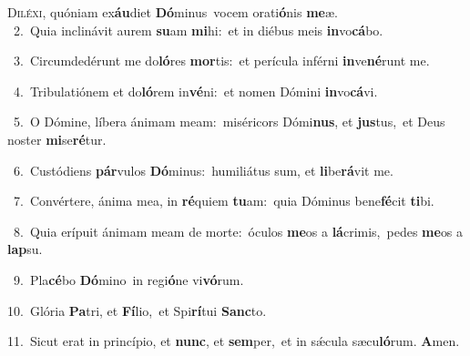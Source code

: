 \lettrine{\initial\textcolor{\initialcolor}{D}}{iléxi,} quóniam ex\-\textbf{áu}\-diet \textbf{Dó}\-minus~\star vocem orati\-\textbf{ó}\-nis \textbf{me}\-æ.\\
{\numbfont\textcolor{\numbcolor}{~2.}}~Quia inclinávit aurem \textbf{su}\-am \textbf{mi}\-hi:~\star et in diébus meis \textbf{in}\-vo\-\textbf{cá}\-bo.\par
{\numbfont\textcolor{\numbcolor}{~3.}}~Circumdedérunt me do\-\textbf{ló}\-res \textbf{mor}\-tis:~\star et perícula inférni \textbf{in}\-ve\-\textbf{né}\-runt me.\par
{\numbfont\textcolor{\numbcolor}{~4.}}~Tribulatiónem et do\-\textbf{ló}\-rem in\-\textbf{vé}\-ni:~\star et nomen Dómini \textbf{in}\-vo\-\textbf{cá}\-vi.\par
{\numbfont\textcolor{\numbcolor}{~5.}}~O Dómine, líbera ánimam meam:~\dagger miséricors Dómi\-\textbf{nus}\-, et \textbf{jus}\-tus,~\star et Deus noster \textbf{mi}\-se\-\textbf{ré}\-tur.\par
{\numbfont\textcolor{\numbcolor}{~6.}}~Custódiens \textbf{pár}\-vulos \textbf{Dó}\-minus:~\star humiliátus sum, et \textbf{li}\-be\-\textbf{rá}\-vit me.\par
{\numbfont\textcolor{\numbcolor}{~7.}}~Convértere, ánima mea, in \textbf{ré}\-quiem \textbf{tu}\-am:~\star quia Dóminus bene\-\textbf{fé}\-cit \textbf{ti}\-bi.\par
{\numbfont\textcolor{\numbcolor}{~8.}}~Quia erípuit ánimam meam de morte:~\dagger óculos \textbf{me}\-os a \textbf{lá}\-crimis,~\star pedes \textbf{me}\-os a \textbf{lap}\-su.\par
{\numbfont\textcolor{\numbcolor}{~9.}}~Pla\-\textbf{cé}\-bo \textbf{Dó}\-mino~\star in regi\-\textbf{ó}\-ne vi\-\textbf{vó}\-rum.\par
{\numbfont\textcolor{\numbcolor}{10.}}~Glória \textbf{Pa}\-tri, et \textbf{Fí}\-lio,~\star et Spi\-\textbf{rí}\-tui \textbf{Sanc}\-to.\par
{\numbfont\textcolor{\numbcolor}{11.}}~Sicut erat in princípio, et \textbf{nunc}\-, et \textbf{sem}\-per,~\star et in sǽcula sæcu\-\textbf{ló}\-rum. \textbf{A}\-men.\par

